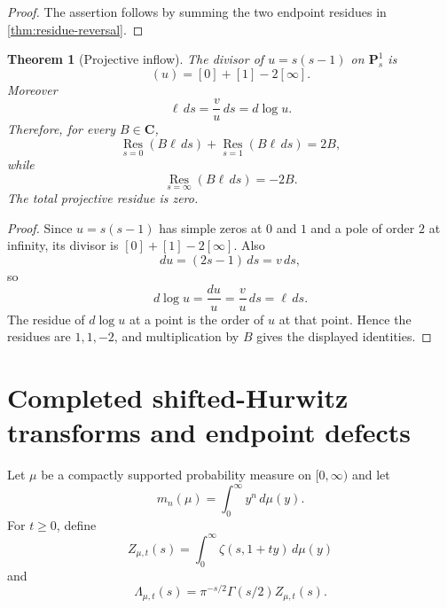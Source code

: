 \documentclass[11pt]{article}
\newcommand{\C}{\mathbf C}
\newcommand{\Res}{\operatorname*{Res}}
\newcommand{\ellp}{\ell}
\newcommand{\1}{\mathbf 1}
\newtheorem{theorem}{Theorem}[section]
\numberwithin{equation}{section}
\begin{document}
\begin{proof}
The assertion follows by summing the two endpoint residues in \cref{thm:residue-reversal}.
\end{proof}

\begin{theorem}[Projective inflow]\label{thm:projective-inflow}
The divisor of $u=s(s-1)$ on $\mathbf P^1_s$ is
\begin{equation}
  (u)=[0]+[1]-2[\infty].
\end{equation}
Moreover
\begin{equation}
  \ellp\,ds=\frac vu\,ds=d\log u.
\end{equation}
Therefore, for every $B\in\C$,
\begin{equation}
  \Res_{s=0}(B\ellp\,ds)+\Res_{s=1}(B\ellp\,ds)=2B,
\end{equation}
while
\begin{equation}
  \Res_{s=\infty}(B\ellp\,ds)=-2B.
\end{equation}
The total projective residue is zero.
\end{theorem}

\begin{proof}
Since $u=s(s-1)$ has simple zeros at $0$ and $1$ and a pole of order $2$ at infinity, its divisor is $[0]+[1]-2[\infty]$.  Also
\begin{equation}
  du=(2s-1)\,ds=v\,ds,
\end{equation}
so
\begin{equation}
  d\log u=\frac{du}{u}=\frac vu\,ds=\ellp\,ds.
\end{equation}
The residue of $d\log u$ at a point is the order of $u$ at that point.  Hence the residues are $1,1,-2$, and multiplication by $B$ gives the displayed identities.
\end{proof}

\section{Completed shifted-Hurwitz transforms and endpoint defects}\label{sec:hurwitz}

Let $\mu$ be a compactly supported probability measure on $[0,\infty)$ and let
\begin{equation}
  m_n(\mu)=\int_0^\infty y^n\,d\mu(y).
\end{equation}
For $t\ge0$, define
\begin{equation}
  Z_{\mu,t}(s)=\int_0^\infty\zeta(s,1+ty)\,d\mu(y)
\end{equation}
and
\begin{equation}
  \Lambda_{\mu,t}(s)=\pi^{-s/2}\Gamma(s/2)Z_{\mu,t}(s).
\end{equation}
\end{document}
